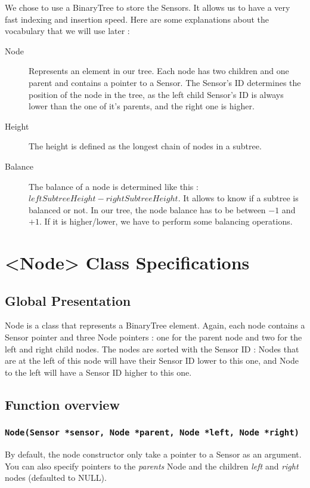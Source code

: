 \documentclass[10pt]{article}
\begin{document}
We chose to use a BinaryTree to store the Sensors. It allows us to have a very fast indexing and insertion speed.
Here are some explanations about the vocabulary that we will use later :

\begin{description}
	\item[Node] Represents an element in our tree. Each node has two children and one parent and contains a pointer to a Sensor. The Sensor's ID determines the position of the node in the tree, as the left child Sensor's ID is always lower than the one of it's parents, and the right one is higher.
	\item[Height] The height is defined as the longest chain of nodes in a subtree.
	\item[Balance] The balance of a node is determined like this : $ leftSubtreeHeight - rightSubtreeHeight$. It allows to know if a subtree is balanced or not. In our tree, the node balance has to be between $-1$ and $+1$. If it is higher/lower, we have to perform some balancing operations.
\end{description}

\section{<Node> Class Specifications}
\subsection{Global Presentation}
Node is a class that represents a BinaryTree element. Again, each node contains a Sensor pointer and three Node pointers : one for the parent node and two for the left and right child nodes. The nodes are sorted with the Sensor ID : Nodes that are at the left of this node will have their Sensor ID lower to this one, and Node to the left will have a Sensor ID higher to this one.

\subsection{Function overview}
\subsubsection*{\tt Node(Sensor *sensor, Node *parent, Node *left, Node *right)}
By default, the node constructor only take a pointer to a Sensor as an argument. You can also specify pointers to the \emph{parents} Node and the children \emph{left} and \emph{right} nodes (defaulted to NULL).
\end{document}
